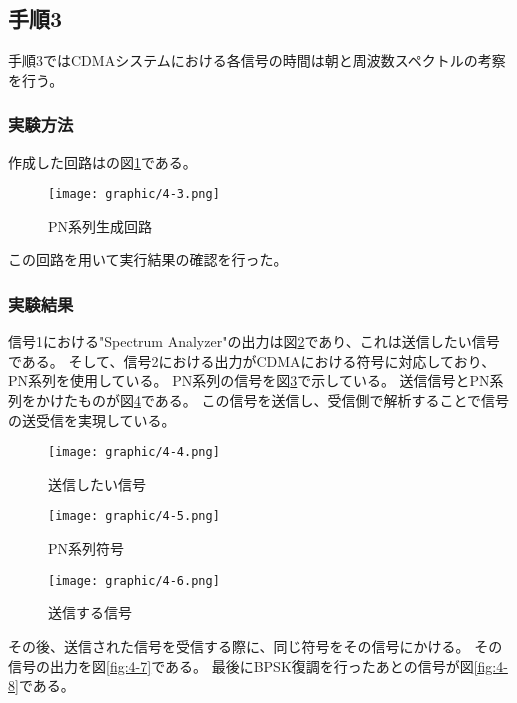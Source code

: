 \documentclass[dvipdfmx]{jsarticle}
\begin{document}
\subsection{手順3}
手順3ではCDMAシステムにおける各信号の時間は朝と周波数スペクトルの考察を行う。

\subsubsection{実験方法}
作成した回路はの図\ref*{fig:4-3}である。

\begin{figure}[H]
  \begin{center}
    \texttt{[image: graphic/4-3.png]}
  \end{center}
  \caption{PN系列生成回路}
  \label{fig:4-3}
\end{figure}

この回路を用いて実行結果の確認を行った。

\subsubsection{実験結果}
信号1における"Spectrum Analyzer"の出力は図\ref*{fig:4-4}であり、これは送信したい信号である。
そして、信号2における出力がCDMAにおける符号に対応しており、PN系列を使用している。
PN系列の信号を図\ref*{fig:4-5}で示している。
送信信号とPN系列をかけたものが図\ref*{fig:4-6}である。
この信号を送信し、受信側で解析することで信号の送受信を実現している。
\begin{figure}[H]
  \begin{center}
    \texttt{[image: graphic/4-4.png]}
  \end{center}
  \caption{送信したい信号}
  \label{fig:4-4}
\end{figure}

\begin{figure}[H]
  \begin{center}
    \texttt{[image: graphic/4-5.png]}
  \end{center}
  \caption{PN系列符号}
  \label{fig:4-5}
\end{figure}

\begin{figure}[H]
  \begin{center}
    \texttt{[image: graphic/4-6.png]}
  \end{center}
  \caption{送信する信号}
  \label{fig:4-6}
\end{figure}

その後、送信された信号を受信する際に、同じ符号をその信号にかける。
その信号の出力を図\ref*{fig:4-7}である。
最後にBPSK復調を行ったあとの信号が図\ref*{fig:4-8}である。
\end{document}
